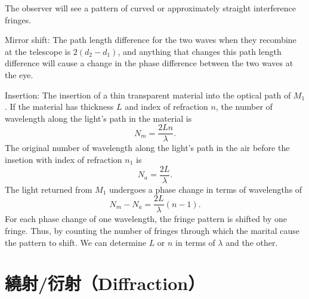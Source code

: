 \documentclass[a4paper,12pt]{report}
\begin{document}
The observer will see a pattern of curved or approximately straight interference fringes.

Mirror shift: The path length difference for the two waves when they recombine at the telescope is $2(d_2-d_1)$, and anything that changes this path length difference will cause a change in the phase difference between the two waves at the eye.

Insertion: The insertion of a thin transparent material into the optical path of $M_1$. If the material has thickness $L$ and index of refraction $n$, the number of wavelength along the light's path in the material is
\[N_m=\frac{2Ln}{\lambda}.\]
The original number of wavelength along the light's path in the air before the insetion with index of refraction $n_1$ is
\[N_a=\frac{2L}{\lambda}.\]
The light returned from $M_1$ undergoes a phase change in terms of wavelengths of
\[N_m-N_a=\frac{2L}{\lambda}(n-1).\]
For each phase change of one wavelength, the fringe pattern is shifted by one fringe. Thus, by counting the number of fringes through which the marital cause the pattern to shift. We can determine $L$ or $n$ in terms of $\lambda$ and the other.


\section{繞射/衍射（Diffraction）}
\end{document}

